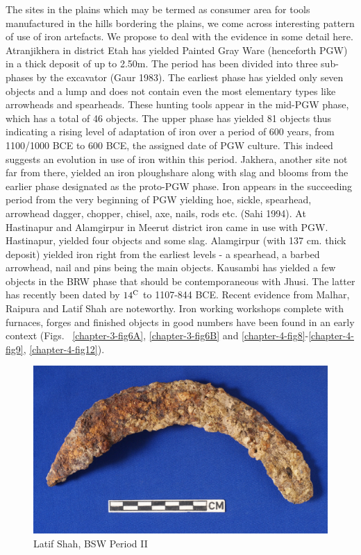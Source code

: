 The sites in the plains which may be termed as consumer area for tools manufactured in the hills bordering the plains, we come across interesting pattern of use of iron artefacts. We propose to deal with the evidence in some detail here. Atranjikhera in district Etah has yielded Painted Gray Ware (henceforth PGW) in a thick deposit of up to 2.50m. The period has been divided into three sub-phases by the excavator (Gaur 1983). The earliest phase has yielded only seven objects and a lump and does not contain even the most elementary types like arrowheads and spearheads. These hunting tools appear in the mid-PGW phase, which has a total of 46 objects. The upper phase has yielded 81 objects thus indicating a rising level of adaptation of iron over a period of 600 years, from 1100/1000 BCE to 600 BCE, the assigned date of PGW culture. This indeed suggests an evolution in use of iron within this period. Jakhera, another site not far from there, yielded an iron ploughshare along with slag and blooms from the earlier phase designated as the proto-PGW phase. Iron appears in the succeeding period from the very beginning of PGW yielding hoe, sickle, spearhead, arrowhead dagger, chopper, chisel, axe, nails, rods etc. (Sahi 1994). At Hastinapur and Alamgirpur in Meerut district iron came in use with PGW. Hastinapur, yielded four objects and some slag. Alamgirpur (with 137 cm. thick deposit) yielded iron right from the earliest levels - a spearhead, a barbed arrowhead, nail and pins being the main objects. Kausambi has yielded a few objects in the BRW phase that should be contemporaneous with Jhusi. The latter has recently been dated by $14^{\rm C}$ to 1107-844 BCE. Recent evidence from Malhar, Raipura and Latif Shah are noteworthy. Iron working workshops complete with furnaces, forges and finished objects in good numbers have been found in an early context (Figs.~ \ref{chapter-3-fig6A}, \ref{chapter-3-fig6B} and \ref{chapter-4-fig8}-\ref{chapter-4-fig9}, \ref{chapter-4-fig12}).

\begin{figure}[H]
\includegraphics[scale=0.75]{images/chapter-4/fig011.jpg}
\caption{ Latif Shah, BSW Period II}\label{chapter-4-fig11}
\end{figure}

